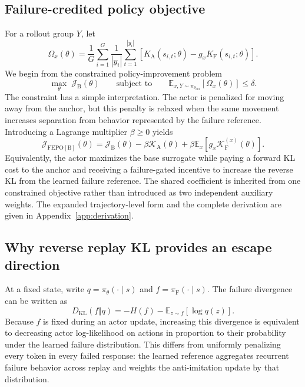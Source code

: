\documentclass{article}
\newcommand{\pol}{\pi_\theta}
\newcommand{\oldpol}{\pi_{\theta_{\mathrm{old}}}}
\newcommand{\failpol}{\pi_{\mathrm F}}
\newcommand{\KL}{D_{\mathrm{KL}}}
\newcommand{\E}{\mathbb{E}}
\begin{document}
\subsection{Failure-credited policy objective}
For a rollout group $Y$, let
\begin{equation}
\Omega_x(\theta)=
\frac{1}{G}\sum_{i=1}^{G}\frac{1}{|y_i|}\sum_{t=1}^{|y_i|}
\left[K_{\mathrm A}(s_{i,t};\theta)-g_xK_{\mathrm F}(s_{i,t};\theta)\right].
\label{eq:group_potential}
\end{equation}
We begin from the constrained policy-improvement problem
\begin{equation}
\max_{\theta}\;\mathcal J_{\mathrm B}(\theta)
\qquad
\text{subject to}
\qquad
\E_{x,Y\sim\oldpol}[\Omega_x(\theta)]\le\delta.
\label{eq:fepo_constrained}
\end{equation}
The constraint has a simple interpretation. The actor is penalized for moving away from the anchor, but this penalty is relaxed when the same movement increases separation from behavior represented by the failure reference. Introducing a Lagrange multiplier $\beta\ge0$ yields
\begin{equation}
\mathcal J_{\mathrm{FEPO}[\mathrm B]}(\theta)
=\mathcal J_{\mathrm B}(\theta)
-\beta\mathcal K_{\mathrm A}(\theta)
+\beta\E_x\!\left[g_x\mathcal K_{\mathrm F}^{(x)}(\theta)\right].
\label{eq:fepo_compact}
\end{equation}
Equivalently, the actor maximizes the base surrogate while paying a forward KL cost to the anchor and receiving a failure-gated incentive to increase the reverse KL from the learned failure reference. The shared coefficient is inherited from one constrained objective rather than introduced as two independent auxiliary weights. The expanded trajectory-level form and the complete derivation are given in Appendix~\ref{app:derivation}.

\subsection{Why reverse replay KL provides an escape direction}
At a fixed state, write $q=\pol(\cdot\mid s)$ and $f=\failpol(\cdot\mid s)$. The failure divergence can be written as
\begin{equation}
\KL(f\Vert q)=-H(f)-\E_{z\sim f}[\log q(z)].
\label{eq:reverse_antiimitation}
\end{equation}
Because $f$ is fixed during an actor update, increasing this divergence is equivalent to decreasing actor log-likelihood on actions in proportion to their probability under the learned failure distribution. This differs from uniformly penalizing every token in every failed response: the learned reference aggregates recurrent failure behavior across replay and weights the anti-imitation update by that distribution.
\end{document}
